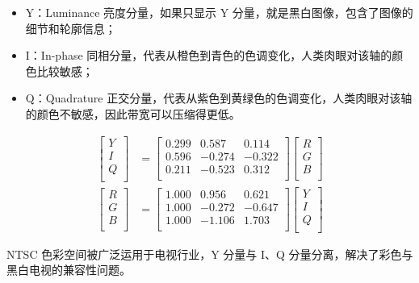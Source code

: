 \documentclass{article}
\begin{document}
\begin{itemize}
    \item Y：Luminance 亮度分量，如果只显示 Y 分量，就是黑白图像，包含了图像的细节和轮廓信息；
    \item I：In-phase 同相分量，代表从橙色到青色的色调变化，人类肉眼对该轴的颜色比较敏感；
    \item Q：Quadrature 正交分量，代表从紫色到黄绿色的色调变化，人类肉眼对该轴的颜色不敏感，因此带宽可以压缩得更低。
\end{itemize}
\begin{align*}
    \left[\begin{matrix}
        Y \\
        I \\
        Q \\
    \end{matrix}\right]&=\left[\begin{matrix}
        0.299 & 0.587 & 0.114 \\
        0.596 & -0.274 & -0.322 \\
        0.211 & -0.523 & 0.312 \\
    \end{matrix}\right]\left[\begin{matrix}
        R \\
        G \\
        B \\
    \end{matrix}\right]
    \\
    \left[\begin{matrix}
        R \\
        G \\
        B \\
    \end{matrix}\right]&=\left[\begin{matrix}
        1.000 & 0.956 & 0.621 \\
        1.000 & -0.272 & -0.647 \\
        1.000 & -1.106 & 1.703 \\
    \end{matrix}\right]\left[\begin{matrix}
        Y \\
        I \\
        Q \\
    \end{matrix}\right]
\end{align*}

NTSC 色彩空间被广泛运用于电视行业，Y 分量与 I、Q 分量分离，解决了彩色与黑白电视的兼容性问题。
\end{document}
